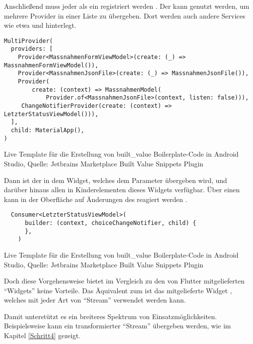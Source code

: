 Anschließend muss jeder  als ein  registriert werden . 
Der  kann genutzt werden, um mehrere Provider in einer Liste zu übergeben.
Dort werden auch andere Services wie etwa   und   hinterlegt.

\ifIncludeFigures
  \begin{listing}[h]
    \begin{verbatim}
MultiProvider(
  providers: [
    Provider<MassnahmenFormViewModel>(create: (_) => MassnahmenFormViewModel()),
    Provider<MassnahmenJsonFile>(create: (_) => MassnahmenJsonFile()),
    Provider(
        create: (context) => MassnahmenModel(
            Provider.of<MassnahmenJsonFile>(context, listen: false))),
     ChangeNotifierProvider(create: (context) => LetzterStatusViewModel())),
  ],
  child: MaterialApp(),
)
\end{verbatim}
    \caption[built_value Live Template]{Live Template für die Erstellung von built_value Boilerplate-Code in Android Studio, Quelle: Jetbrains Marketplace Built Value Snippets Plugin}
    \label{lst:MultiProvider}
  \end{listing}
\fi

Dann ist der  in dem Widget, welches dem Parameter  übergeben wird, und darüber hinaus allen in Kinderelementen dieses Widgets verfügbar.
Über einen  kann in der Oberfläche auf Änderungen des  reagiert werden \Lst{\ref{lst:Consumer}}.

\ifIncludeFigures
  \begin{listing}[h]
    \begin{verbatim}
  Consumer<LetzterStatusViewModel>(
      builder: (context, choiceChangeNotifier, child) {
      },
    )
\end{verbatim}
    \caption[built_value Live Template]{Live Template für die Erstellung von built_value Boilerplate-Code in Android Studio, Quelle: Jetbrains Marketplace Built Value Snippets Plugin}
    \label{lst:Consumer}
  \end{listing}
\fi


Doch diese Vorgehensweise bietet im Vergleich zu den von Flutter mitgelieferten \enquote{Widgets} keine Vorteile.
Das Äquivalent zum  ist das mitgelieferte Widget ,
welches mit jeder Art von \enquote{Stream} verwendet werden kann.

Damit unterstützt es ein breiteres Spektrum von Einsatzmöglichkeiten.
Beispielsweise kann ein transformierter \enquote{Stream} übergeben werden, wie im Kapitel \ref{Schritt4} gezeigt.

